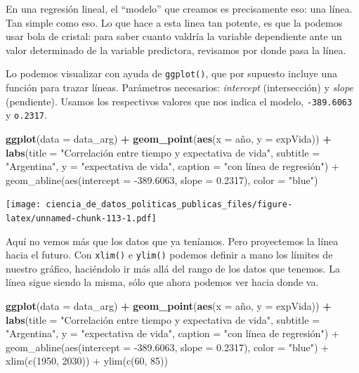 \documentclass[]{book}
\newenvironment{Shaded}{\begin{snugshade}}{\end{snugshade}}
\newcommand{\KeywordTok}[1]{\textcolor[rgb]{0.13,0.29,0.53}{\textbf{#1}}}
\newcommand{\DataTypeTok}[1]{\textcolor[rgb]{0.13,0.29,0.53}{#1}}
\newcommand{\StringTok}[1]{\textcolor[rgb]{0.31,0.60,0.02}{#1}}
\newcommand{\OperatorTok}[1]{\textcolor[rgb]{0.81,0.36,0.00}{\textbf{#1}}}
\newcommand{\NormalTok}[1]{#1}
\begin{document}
En una regresión lineal, el ``modelo'' que creamos es precisamente eso:
una línea. Tan simple como eso. Lo que hace a esta linea tan potente, es
que la podemos usar bola de cristal: para saber cuanto valdría la
variable dependiente ante un valor determinado de la variable
predictora, revisamos por donde pasa la línea.

Lo podemos visualizar con ayuda de \texttt{ggplot()}, que por supuesto
incluye una función para trazar líneas. Parámetros necesarios:
\emph{intercept} (intersección) y \emph{slope} (pendiente). Usamos los
respectivos valores que nos indica el modelo, \texttt{-389.6063} y
\texttt{o.2317}.

\begin{Shaded}
\begin{Highlighting}[]
\KeywordTok{ggplot}\NormalTok{(}\DataTypeTok{data =}\NormalTok{ data_arg) }\OperatorTok{+}\StringTok{ }
\StringTok{    }\KeywordTok{geom_point}\NormalTok{(}\KeywordTok{aes}\NormalTok{(}\DataTypeTok{x =}\NormalTok{ año, }\DataTypeTok{y =}\NormalTok{ expVida)) }\OperatorTok{+}
\StringTok{    }\KeywordTok{labs}\NormalTok{(}\DataTypeTok{title =} \StringTok{"Correlación entre tiempo y expectativa de vida"}\NormalTok{,}
         \DataTypeTok{subtitle =} \StringTok{"Argentina"}\NormalTok{,}
         \DataTypeTok{y =} \StringTok{"expectativa de vida"}\NormalTok{,}
         \DataTypeTok{caption =} \StringTok{"con línea de regresión") +}
\StringTok{    geom_abline(aes(intercept = -389.6063, slope = 0.2317), color = "}\NormalTok{blue}\StringTok{")}
\end{Highlighting}
\end{Shaded}

\texttt{[image: ciencia\_de\_datos\_politicas\_publicas\_files/figure-latex/unnamed-chunk-113-1.pdf]}

Aquí no vemos más que los datos que ya teníamos. Pero proyectemos la
línea hacia el futuro. Con \texttt{xlim()} e \texttt{ylim()} podemos
definir a mano los límites de nuestro gráfico, haciéndolo ir más allá
del rango de los datos que tenemos. La línea sigue siendo la misma, sólo
que ahora podemos ver hacia donde va.

\begin{Shaded}
\begin{Highlighting}[]
\KeywordTok{ggplot}\NormalTok{(}\DataTypeTok{data =}\NormalTok{ data_arg) }\OperatorTok{+}\StringTok{ }
\StringTok{    }\KeywordTok{geom_point}\NormalTok{(}\KeywordTok{aes}\NormalTok{(}\DataTypeTok{x =}\NormalTok{ año, }\DataTypeTok{y =}\NormalTok{ expVida)) }\OperatorTok{+}
\StringTok{    }\KeywordTok{labs}\NormalTok{(}\DataTypeTok{title =} \StringTok{"Correlación entre tiempo y expectativa de vida"}\NormalTok{,}
         \DataTypeTok{subtitle =} \StringTok{"Argentina"}\NormalTok{,}
         \DataTypeTok{y =} \StringTok{"expectativa de vida"}\NormalTok{,}
         \DataTypeTok{caption =} \StringTok{"con línea de regresión") +}
\StringTok{    geom_abline(aes(intercept = -389.6063, slope = 0.2317), color = "}\NormalTok{blue}\StringTok{") +}
\StringTok{    xlim(c(1950, 2030)) +}
\StringTok{    ylim(c(60, 85))}
\end{Highlighting}
\end{Shaded}
\end{document}
